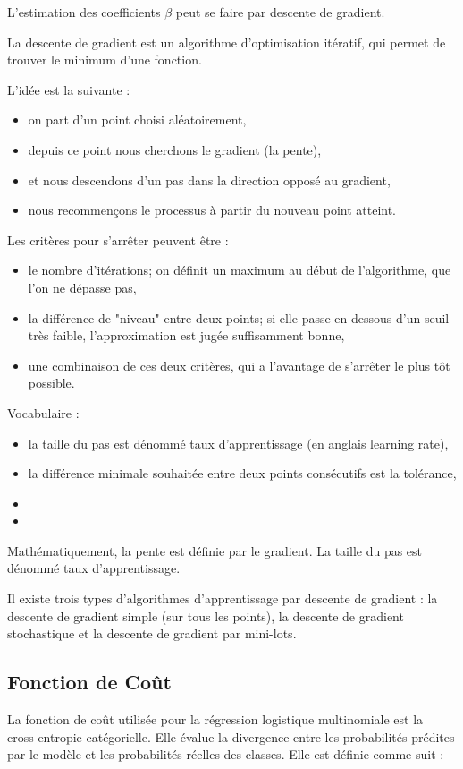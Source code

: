 \documentclass[10pt,french]{report}
\begin{document}
    L'estimation des coefficients $\beta$ peut se faire par descente de gradient.
    
    La descente de gradient est un algorithme d'optimisation itératif, qui permet de trouver le minimum d'une fonction.
    
    L'idée est la suivante :
    \begin{itemize}
    	\item on part d'un point choisi aléatoirement,
    	\item depuis ce point nous cherchons le gradient (la pente),
    	\item et nous descendons d'un pas dans la direction opposé au gradient,
    	\item nous recommençons le processus à partir du nouveau point atteint.
    \end{itemize}
    
    Les critères pour s'arrêter peuvent être :
    \begin{itemize}
    	\item le nombre d'itérations; on définit un maximum au début de l'algorithme, que l'on ne dépasse pas,
    	\item la différence de "niveau" entre deux points; si elle passe en dessous d'un seuil très faible, l'approximation est jugée suffisamment bonne,
    	\item une combinaison de ces deux critères, qui a l'avantage de s'arrêter le plus tôt possible.
    \end{itemize}
    
    Vocabulaire :
    \begin{itemize}
    	\item la taille du pas est dénommé taux d'apprentissage (en anglais learning rate),
    	\item la différence minimale souhaitée entre deux points consécutifs est la tolérance,
    	\item
    	\item
    \end{itemize}
    
    Mathématiquement, la pente est définie par le gradient. La taille du pas est dénommé taux d'apprentissage.
    
    Il existe trois types d'algorithmes d'apprentissage par descente de gradient : la descente de gradient simple (sur tous les points), la descente de gradient stochastique et la descente de gradient par mini-lots.
    
    
	\subsection{Fonction de Coût}
	La fonction de coût utilisée pour la régression logistique multinomiale est la cross-entropie catégorielle. Elle évalue la divergence entre les probabilités prédites par le modèle et les probabilités réelles des classes. Elle est définie comme suit :
\end{document}
